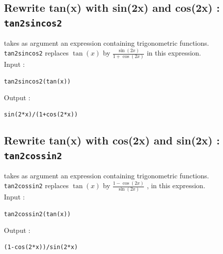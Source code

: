 \documentclass[a4paper,11pt]{book}
\begin{document}
\subsection{Rewrite tan(x) with sin(2x) and  cos(2x) : {\tt tan2sincos2}}
 takes as argument an expression containing 
trigonometric functions.\\
{\tt tan2sincos2} replaces $\tan(x)$ by 
$\displaystyle \frac{\sin(2x)}{1+\cos(2x)}$ in this  expression.\\
Input :
\begin{center}{\tt tan2sincos2(tan(x))}\end{center}
Output :
\begin{center}{\tt sin(2*x)/(1+cos(2*x))}\end{center}

\subsection{Rewrite tan(x) with cos(2x) and  sin(2x) : {\tt tan2cossin2}}
 takes as argument an expression 
containing trigonometric functions.\\
{\tt tan2cossin2} replaces $\tan(x)$ by 
$\displaystyle \frac{1-\cos(2x)}{\sin(2x)}$ , in this expression.\\
Input :
\begin{center}{\tt tan2cossin2(tan(x))}\end{center}
Output :
\begin{center}{\tt (1-cos(2*x))/sin(2*x)}\end{center}
\end{document}
